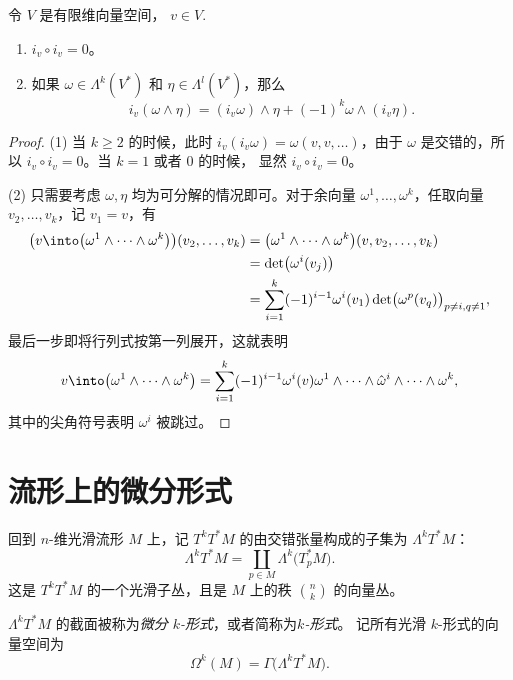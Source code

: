 \begin{lemma}
  令 $V$ 是有限维向量空间， $v\in V$.
  \begin{enumerate}
    \item $i_v\circ i_v=0$。
    \item 如果 $\omega\in \Lambda^k(V^*)$ 和 $\eta\in\Lambda^l(V^*)$，那么
    \begin{equation}\label{eq:interior multiplication}
      i_v(\omega\wedge\eta)=(i_v\omega)\wedge\eta+(-1)^k\omega\wedge(i_v\eta).
    \end{equation}
  \end{enumerate}
\end{lemma}
\begin{proof}
  (1) 当 $k\geq 2$ 的时候，此时 $i_v(i_v\omega)=\omega(v,v,\dots)$，由于
  $\omega$ 是交错的，所以 $i_v\circ i_v=0$。当 $k=1$ 或者 $0$ 的时候，
  显然 $i_v\circ i_v=0$。

  (2) 只需要考虑 $\omega,\eta$ 均为可分解的情况即可。对于余向量
  $\omega^1,\dots,\omega^k$，任取向量 $v_2,\dots,v_k$，记
  $v_1=v$，有 
  \begin{align*}
    \bigl(v\into\bigl(\omega^1\wedge\cdots\wedge\omega^k\bigr)\bigr)
    (v_2,\dots,v_k)&=\bigl(\omega^1\wedge\cdots\wedge\omega^k\bigr)(v,v_2,\dots,v_k)\\
    &=\det\bigl(\omega^i(v_j)\bigr)\\
    &=\sum_{i=1}^k (-1)^{i-1}\omega^i(v_1)
    \det\bigl(\omega^p(v_q)\bigr)_{p\ne i,q\neq 1},
  \end{align*}
  最后一步即将行列式按第一列展开，这就表明
  \begin{equation}\label{eq:i_v}
    v\into\bigl(\omega^1\wedge\cdots\wedge\omega^k\bigr)
    =\sum_{i=1}^k(-1)^{i-1}\omega^i(v)\omega^1\wedge\cdots\wedge
    \hat\omega^i\wedge\cdots\wedge \omega^k,
  \end{equation}
  其中的尖角符号表明 $\omega^i$ 被跳过。
\end{proof}
 
\section{流形上的微分形式}

回到 $n$-维光滑流形 $M$ 上，记 $T^kT^*M$ 的由交错张量构成的子集为
$\Lambda^kT^*M$：
\[
  \Lambda^k T^*M=\coprod_{p\in M}\Lambda^k\bigl(T_p^*M\bigr).
\]
这是 $T^kT^*M$ 的一个光滑子丛，且是 $M$ 上的秩 $\binom{n}{k}$ 的向量丛。

$\Lambda^kT^*M$ 的截面被称为\emph{微分 $k$-形式}，或者简称为\emph{$k$-形式}。
记所有光滑 $k$-形式的向量空间为
\[
  \Omega^k(M)=\Gamma\bigl(\Lambda^kT^*M\bigr)  .
\]

